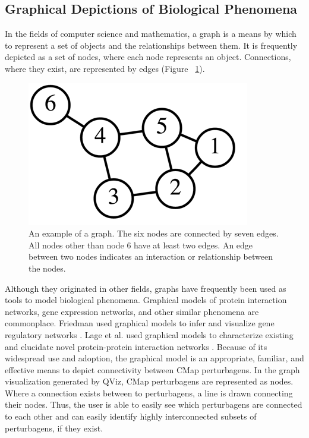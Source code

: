 \documentclass[12pt]{article}
\begin{document}
\subsection{Graphical Depictions of Biological Phenomena}

In the fields of computer science and mathematics, a graph is a means by which to represent a set of objects and the relationships between them. It is frequently depicted as a set of nodes, where each node represents an object. Connections, where they exist, are represented by edges (Figure ~\ref{fig:graph}).


\begin{figure}[h]
\centering
\includegraphics[scale=0.5]{img/graph_example.png}
\caption{An example of a graph. The six nodes are connected by seven edges. All nodes other than node 6 have at least two edges. An edge between two nodes indicates an interaction or relationship between the nodes.}
\label{fig:graph}
\end{figure} 

Although they originated in other fields, graphs have frequently been used as tools to model biological phenomena. Graphical models of protein interaction networks, gene expression networks, and other similar phenomena are commonplace. Friedman used graphical models to infer and visualize gene regulatory networks \cite{friedman_inferring_2004}. Lage et al. used graphical models to characterize existing and elucidate novel protein-protein interaction networks \cite{lage_human_2007}. Because of its widespread use and adoption, the graphical model is an appropriate, familiar, and effective means to depict connectivity between CMap perturbagens.
In the graph visualization generated by QViz, CMap perturbagens are represented as nodes. Where a connection exists between to perturbagens, a line is drawn connecting their nodes. Thus, the user is able to easily see which perturbagens are connected to each other and can easily identify highly interconnected subsets of perturbagens, if they exist. 
 
\end{document}
